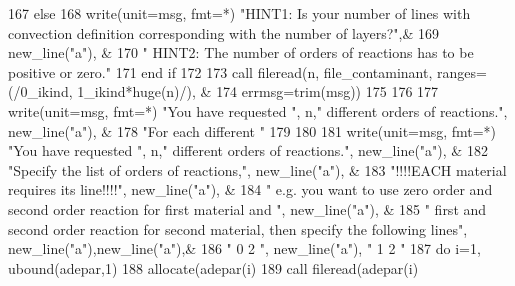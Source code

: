 \begin{DoxyCode}
{{{167       \textcolor{keywordflow}{else}
168         \textcolor{keyword}{write}(unit=msg, fmt=*) \textcolor{stringliteral}{"HINT1: Is your number of lines with convection definition corresponding
       with the number of layers?"}\textcolor{comment}{,&}
169 \textcolor{comment}{        new\_line(}\textcolor{stringliteral}{"a"}), &
170         \textcolor{stringliteral}{"   HINT2: The number of orders of reactions has to be positive or zero."}
171 \textcolor{keywordflow}{      end if}
172        
173        \textcolor{keyword}{call }fileread(n, file_contaminant, ranges=(/0\_ikind, 1\_ikind*huge\textcolor{comment}{(n)/), & }
174 \textcolor{comment}{         errmsg=trim(msg))}
175 \textcolor{comment}{       }
176 \textcolor{comment}{       }
177 \textcolor{comment}{       }\textcolor{keyword}{write}(unit=msg, fmt=*) \textcolor{stringliteral}{"You have requested "}, n,\textcolor{stringliteral}{" different orders of reactions."}\textcolor{comment}{, new\_line(}\textcolor{stringliteral}{"a"}\textcolor{comment}{), &}
178 \textcolor{comment}{           }\textcolor{stringliteral}{"For each different "}
179        
180        
181        \textcolor{keyword}{write}(unit=msg, fmt=*) \textcolor{stringliteral}{"You have requested "}, n,\textcolor{stringliteral}{" different orders of reactions."}\textcolor{comment}{, new\_line(}\textcolor{stringliteral}{"a"}\textcolor{comment}{), &}
182 \textcolor{comment}{           }\textcolor{stringliteral}{"Specify the list of orders of reactions,"}, new\_line(\textcolor{stringliteral}{"a"}), &
183            \textcolor{stringliteral}{"!!!!EACH material requires its line!!!!"},  new\_line(\textcolor{stringliteral}{"a"}), &
184            \textcolor{stringliteral}{"    e.g. you want to use zero order and second order reaction for first material and "}\textcolor{comment}{,  
      new\_line(}\textcolor{stringliteral}{"a"}\textcolor{comment}{), & }
185 \textcolor{comment}{           }\textcolor{stringliteral}{" first and second order reaction for second material, then specify the following lines"}\textcolor{comment}{, 
      new\_line(}\textcolor{stringliteral}{"a"}\textcolor{comment}{),new\_line(}\textcolor{stringliteral}{"a"}\textcolor{comment}{),&}
186 \textcolor{comment}{           " 0 2 }\textcolor{stringliteral}{", new\_line("}a\textcolor{stringliteral}{"), "} 1 2 \textcolor{stringliteral}{"}
187 \textcolor{stringliteral}{}\textcolor{stringliteral}{       do i=1, ubound(adepar,1)}
188 \textcolor{stringliteral}{}\textcolor{stringliteral}{         allocate(adepar(i)%
189 \textcolor{stringliteral}{}\textcolor{stringliteral}{         call fileread(adepar(i)%
}}}}}
\end{DoxyCode}
